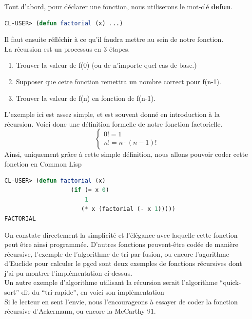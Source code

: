 \documentclass[a4paper, 12pt]{article}
\numberwithin{equation}{subsection}
\begin{document}
Tout d'abord, pour déclarer une fonction, nous utiliserons le mot-clé {\bf defun}.
\begin{lstlisting}[language=Lisp]
CL-USER> (defun factorial (x) ...)
\end{lstlisting}
Il faut ensuite réfléchir à ce qu'il faudra mettre au sein de notre fonction. \\
La récursion est un processus en 3 étapes. \\
\begin{enumerate}
  \item Trouver la valeur de f(0) (ou de n'importe quel cas de base.)
  \item Supposer que cette fonction remettra un nombre correct pour f(n-1).
  \item Trouver la valeur de f(n) en fonction de f(n-1).
\end{enumerate}
L'exemple ici est assez simple, et est souvent donné en introduction à la récursion. Voici donc une définition formelle de notre fonction factorielle. \\
$$\begin{cases}0! = 1 \\ n! = n \cdot (n - 1)! \end{cases}$$
Ainsi, uniquement grâce à cette simple définition, nous allons pouvoir coder cette fonction en Common Lisp \\
\begin{lstlisting}[language=Lisp]
CL-USER> (defun factorial (x)
                   (if (= x 0)
                       1
                      (* x (factorial (- x 1)))))
FACTORIAL
\end{lstlisting}
On constate directement la simplicité et l'élégance avec laquelle cette fonction peut être ainsi programmée. D'autres fonctions peuvent-être codée de manière récursive, l'exemple de l'algorithme de tri par fusion, ou encore l'agorithme d'Euclide pour calculer le pgcd sont deux exemples de fonctions récursives dont j'ai pu montrer l'implémentation ci-dessus. \\
Un autre exemple d'algorithme utilisant la récursion serait l'algorithme ``quick-sort'' dit du ``tri-rapide'', en voici son implémentation \\

Si le lecteur en sent l'envie, nous l'encourageons à essayer de coder la fonction récursive d'Ackermann, ou encore la McCarthy 91. \\
\end{document}
